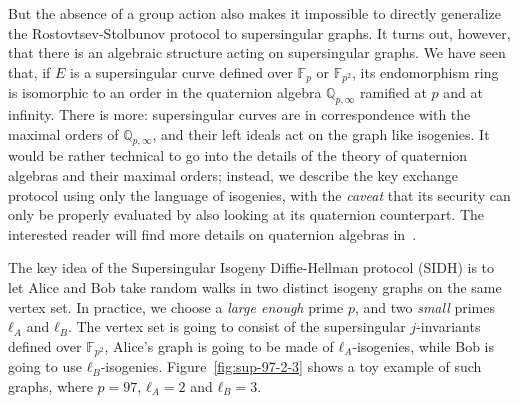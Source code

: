 \documentclass[10pt]{article}
\theoremstyle{plain}
\theoremstyle{definition}
\def\F{\ensuremath{\mathbb{F}}}
\begin{document}
But the absence of a group action also makes it impossible to directly
generalize the Rostovtsev-Stolbunov protocol to supersingular
graphs. %
It turns out, however, that there is an algebraic structure acting on
supersingular graphs. %
We have seen that, if $E$ is a supersingular curve defined over $\F_p$
or $\F_{p^2}$, its endomorphism ring is isomorphic to an order in the
quaternion algebra $ℚ_{p,∞}$ ramified at $p$ and at infinity. %
There is more: supersingular curves are in correspondence with the
maximal orders of $ℚ_{p,∞}$, and their left ideals act on the graph
like isogenies. %
It would be rather technical to go into the details of the theory of
quaternion algebras and their maximal orders; instead, we describe the
key exchange protocol using only the language of isogenies, with the
\emph{caveat} that its security can only be properly evaluated by
also looking at its quaternion counterpart. %
The interested reader will find more details on quaternion algebras
in~\cite{waterhouse69,pizer1,pizer2,kohel,belding08-thesis,kohel2014quaternion}.

The key idea of the Supersingular Isogeny Diffie-Hellman protocol
(SIDH) is to let Alice and Bob take random walks in two distinct
isogeny graphs on the same vertex set. %
In practice, we choose a \emph{large enough} prime $p$, and two
\emph{small} primes $ℓ_A$ and $ℓ_B$. %
The vertex set is going to consist of the supersingular $j$-invariants
defined over $\F_{p^2}$, Alice's graph is going to be made of
$ℓ_A$-isogenies, while Bob is going to use $ℓ_B$-isogenies. %
Figure~\ref{fig:sup-97-2-3} shows a toy example of such graphs, where
$p=97$, $ℓ_A=2$ and $ℓ_B=3$.
\end{document}
